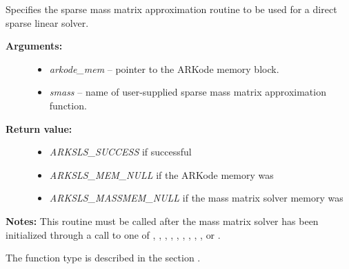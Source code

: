 \documentclass[letterpaper,10pt,english]{sphinxmanual}
\begin{document}
\begin{fulllineitems}
\label{c_interface/User_callable:c.ARKSlsSetSparseMassFn}
Specifies the sparse mass matrix approximation routine to
be used for a direct sparse linear solver.
\begin{description}
\item[{\textbf{Arguments:}}] \leavevmode\begin{itemize}
\item {} 
\emph{arkode\_mem} -- pointer to the ARKode memory block.

\item {} 
\emph{smass} -- name of user-supplied sparse mass matrix approximation function.

\end{itemize}

\item[{\textbf{Return value:}}] \leavevmode\begin{itemize}
\item {} 
\emph{ARKSLS\_SUCCESS}  if successful

\item {} 
\emph{ARKSLS\_MEM\_NULL}  if the ARKode memory was 

\item {} 
\emph{ARKSLS\_MASSMEM\_NULL} if the mass matrix solver memory was 

\end{itemize}

\end{description}

\textbf{Notes:} This routine must be called after the mass matrix solver
has been initialized through a call to one of
{\hyperref[c_interface/User_callable:c.ARKMassDense]{\emph{}}}, {\hyperref[c_interface/User_callable:c.ARKMassLapackDense]{\emph{}}},
{\hyperref[c_interface/User_callable:c.ARKMassBand]{\emph{}}}, {\hyperref[c_interface/User_callable:c.ARKMassLapackBand]{\emph{}}},
{\hyperref[c_interface/User_callable:c.ARKMassKLU]{\emph{}}}, {\hyperref[c_interface/User_callable:c.ARKMassSuperLUMT]{\emph{}}},
{\hyperref[c_interface/User_callable:c.ARKMassSpgmr]{\emph{}}}, {\hyperref[c_interface/User_callable:c.ARKMassSpbcg]{\emph{}}},
{\hyperref[c_interface/User_callable:c.ARKMassSptfqmr]{\emph{}}}, {\hyperref[c_interface/User_callable:c.ARKMassSpfgmr]{\emph{}}} or
{\hyperref[c_interface/User_callable:c.ARKMassPcg]{\emph{}}}.

The function type {\hyperref[c_interface/User_supplied:c.ARKSlsSparseMassFn]{\emph{}}} is described in the section
{\hyperref[c_interface/User_supplied:cinterface-usersupplied]{\emph{}}}.

\end{fulllineitems}
\end{document}
